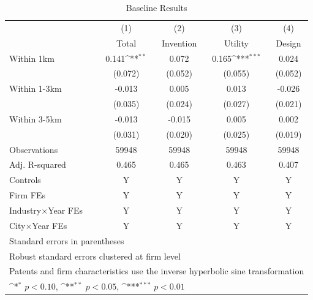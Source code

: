 \begin{table}[!htbp]\centering
\def\sym#1{\ifmmode^{#1}\else\(^{#1}\)\fi}
\caption{Baseline Results}
\label{tab:baseline}
\begin{tabular}{l*{4}{c}}
\toprule
            &\multicolumn{1}{c}{(1)}&\multicolumn{1}{c}{(2)}&\multicolumn{1}{c}{(3)}&\multicolumn{1}{c}{(4)}\\
            &\multicolumn{1}{c}{Total}&\multicolumn{1}{c}{Invention}&\multicolumn{1}{c}{Utility}&\multicolumn{1}{c}{Design}\\
\midrule
Within 1km  &       0.141\sym{**} &       0.072         &       0.165\sym{***}&       0.024         \\
            &     (0.072)         &     (0.052)         &     (0.055)         &     (0.052)         \\
\addlinespace
Within 1-3km&      -0.013         &       0.005         &       0.013         &      -0.026         \\
            &     (0.035)         &     (0.024)         &     (0.027)         &     (0.021)         \\
\addlinespace
Within 3-5km&      -0.013         &      -0.015         &       0.005         &       0.002         \\
            &     (0.031)         &     (0.020)         &     (0.025)         &     (0.019)         \\
\midrule
Observations&       59948         &       59948         &       59948         &       59948         \\
Adj. R-squared&       0.465         &       0.465         &       0.463         &       0.407         \\
Controls    &           Y         &           Y         &           Y         &           Y         \\
Firm FEs    &           Y         &           Y         &           Y         &           Y         \\
Industry$\times$Year FEs&           Y         &           Y         &           Y         &           Y         \\
City$\times$Year FEs&           Y         &           Y         &           Y         &           Y         \\
\bottomrule
\multicolumn{5}{l}{\footnotesize Standard errors in parentheses}\\
\multicolumn{5}{l}{\footnotesize Robust standard errors clustered at firm level}\\
\multicolumn{5}{l}{\footnotesize Patents and firm characteristics use the inverse hyperbolic sine transformation}\\
\multicolumn{5}{l}{\footnotesize \sym{*} \(p<0.10\), \sym{**} \(p<0.05\), \sym{***} \(p<0.01\)}\\
\end{tabular}
\end{table}